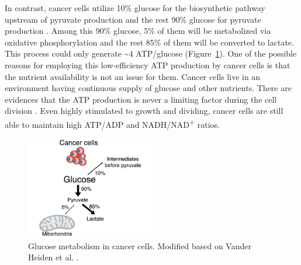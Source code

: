 In contrast, cancer cells utilize 10\% glucose for the biosynthetic pathway upstream of pyruvate production and the rest 90\% glucose for pyruvate production \cite{ward_metabolic_2012,heiden_understanding_2009}. Among this 90\% glucose, 5\% of them will be metabolized via oxidative phosphorylation and the rest 85\% of them will be converted to lactate. This process could only generate \textasciitilde4 ATP/glucose (Figure~\ref{fig:fig1.4}). One of the possible reasons for employing this low-efficiency ATP production by cancer cells is that the nutrient availability is not an issue for them. Cancer cells live in an environment having continuous supply of glucose and other nutrients. There are evidences that the ATP production is never a limiting factor during the cell division \cite{deberardinis_biology_2008,christofk_m2_2008}. Even highly stimulated to growth and dividing, cancer cells are still able to maintain high ATP/ADP and NADH/NAD\textsuperscript{+} ratios.

\begin{figure}[htbp]
\centering
\includegraphics[width=0.5\textwidth]{figs/fig1-4 aerobic glycolysis.pdf}
\caption[Glucose metabolism in cancer cells]{\footnotesize Glucose metabolism in cancer cells. Modified based on Vander Heiden et al. \cite{heiden_understanding_2009}.}
\label{fig:fig1.4}
\end{figure}

